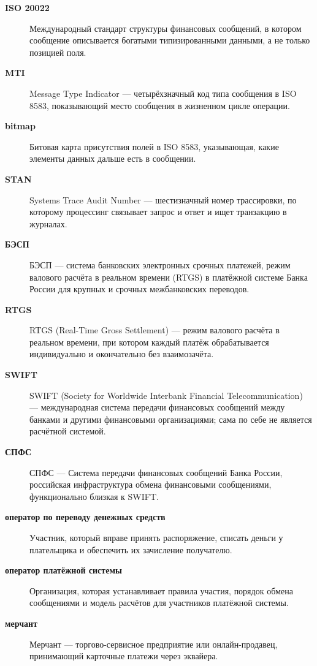 \begin{description}
  \item[\textbf{ISO 20022}] Международный стандарт структуры финансовых сообщений, в котором сообщение описывается богатыми типизированными данными, а не только позицией поля.

  \item[\textbf{MTI}] Message Type Indicator — четырёхзначный код типа сообщения в ISO 8583, показывающий место сообщения в жизненном цикле операции.

  \item[\textbf{bitmap}] Битовая карта присутствия полей в ISO 8583, указывающая, какие элементы данных дальше есть в сообщении.

  \item[\textbf{STAN}] Systems Trace Audit Number — шестизначный номер трассировки, по которому процессинг связывает запрос и ответ и ищет транзакцию в журналах.

  \item[\textbf{БЭСП}] БЭСП — система банковских электронных срочных платежей, режим валового расчёта в реальном времени (RTGS) в платёжной системе Банка России для крупных и срочных межбанковских переводов.

  \item[\textbf{RTGS}] RTGS (Real-Time Gross Settlement) — режим валового расчёта в реальном времени, при котором каждый платёж обрабатывается индивидуально и окончательно без взаимозачёта.

  \item[\textbf{SWIFT}] SWIFT (Society for Worldwide Interbank Financial Telecommunication) — международная система передачи финансовых сообщений между банками и другими финансовыми организациями; сама по себе не является расчётной системой.

  \item[\textbf{СПФС}] СПФС — Система передачи финансовых сообщений Банка России, российская инфраструктура обмена финансовыми сообщениями, функционально близкая к SWIFT.

  \item[\textbf{оператор по переводу денежных средств}] Участник, который вправе принять распоряжение, списать деньги у плательщика и обеспечить их зачисление получателю.

  \item[\textbf{оператор платёжной системы}] Организация, которая устанавливает правила участия, порядок обмена сообщениями и модель расчётов для участников платёжной системы.

  \item[\textbf{мерчант}] Мерчант — торгово-сервисное предприятие или онлайн-продавец, принимающий карточные платежи через эквайера.

\end{description}
